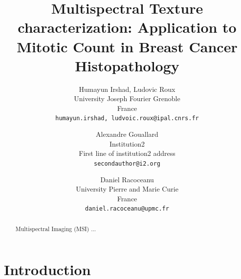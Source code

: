\documentclass[10pt,twocolumn,letterpaper]{article}
\begin{document}
\title{Multispectral Texture characterization: Application to Mitotic Count in Breast Cancer Histopathology}

\author{Humayun Irshad, Ludovic Roux\\
	University Joseph Fourier Grenoble \\ France\\
	{\tt\small {humayun.irshad, ludvoic.roux}@ipal.cnrs.fr} \\
	\and 
	Alexandre Gouallard\\
	Institution2\\ First line of institution2 address\\
	{\tt\small secondauthor@i2.org} \\
	\and
	Daniel Racoceanu\\
	University Pierre and Marie Curie \\ France\\
	{\tt\small daniel.racoceanu@upmc.fr}
}

\maketitle

\begin{abstract}
Multispectral Imaging (MSI) ...
\end{abstract}

\section{Introduction}
\end{document}
